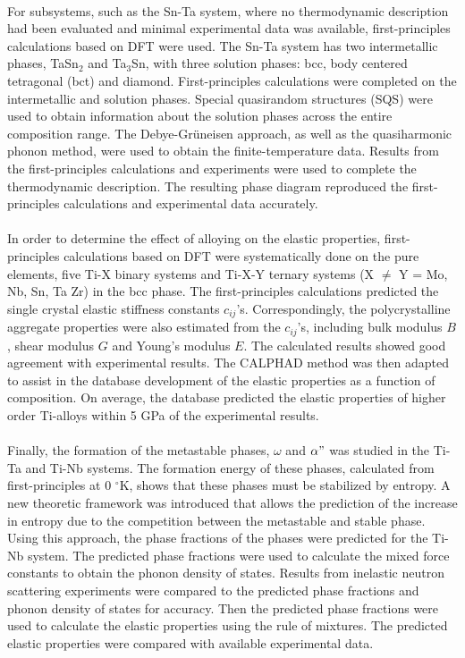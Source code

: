 \paragraph*{} For subsystems, such as the Sn-Ta system, where no thermodynamic description had been evaluated and minimal experimental data was available, first-principles calculations based on DFT were used. The Sn-Ta system has two intermetallic phases, TaSn$_{2}$ and Ta$_{3}$Sn, with three solution phases: bcc, body centered tetragonal (bct) and diamond. First-principles calculations were completed on the intermetallic and solution phases. Special quasirandom structures (SQS) were used to obtain information about the solution phases across the entire composition range. The Debye-Gr\"uneisen approach, as well as the quasiharmonic phonon method, were used to obtain the finite-temperature data. Results from the first-principles calculations and experiments were used to complete the thermodynamic description. The resulting phase diagram reproduced the first-principles calculations and experimental data accurately.
\paragraph*{} In order to determine the effect of alloying on the elastic properties, first-principles calculations based on DFT were systematically done on the pure elements, five Ti-X binary systems and Ti-X-Y ternary systems (X $\neq $ Y = Mo, Nb, Sn, Ta Zr) in the bcc phase. The first-principles calculations predicted the single crystal elastic stiffness constants $c_{ij}$'s. Correspondingly, the polycrystalline aggregate properties were also estimated from the $c_{ij}$'s, including bulk modulus $B$, shear modulus $G$ and Young's modulus $E$. The calculated results showed good agreement with experimental results. The CALPHAD method was then adapted to assist in the database development of the elastic properties as a function of composition. On average, the database predicted the elastic properties of higher order Ti-alloys within 5 GPa of the experimental results.
\paragraph*{} Finally, the formation of the metastable phases, $\omega$ and $\alpha"$ was studied in the Ti-Ta and Ti-Nb systems. The formation energy of these phases, calculated from first-principles at 0 $^\circ$K, shows that these phases must be stabilized by entropy. A new theoretic framework was introduced that allows the prediction of the increase in entropy due to the competition between the metastable and stable phase. Using this approach, the phase fractions of the phases were predicted for the Ti-Nb system. The predicted phase fractions were used to calculate the mixed force constants to obtain the phonon density of states. Results from inelastic neutron scattering experiments were compared to the predicted phase fractions and phonon density of states for accuracy. Then the predicted phase fractions were used to calculate the elastic properties using the rule of mixtures. The predicted elastic properties were compared with available experimental data.
